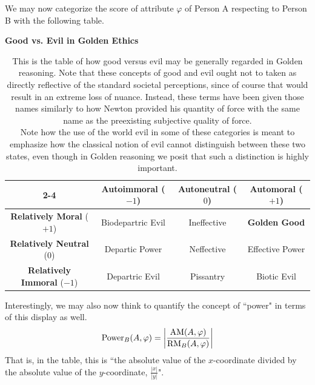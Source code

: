 We may now categorize the score of attribute $\varphi$ of Person A respecting to Person B with the following table. 

\begin{table}[htbp]
    \centering
    \textbf{\large {Good vs. Evil in Golden Ethics}} \\
    \vspace{0.5em}
    \begin{tabular}{|c|c|c|c|}
        \cline{2-4}
        \multicolumn{1}{c|}{} & \textbf{Autoimmoral} ($-1$) & \textbf{Autoneutral} ($0$) & \textbf{Automoral} ($+1$) \\
        \hline
        \textbf{Relatively Moral} ($+1$) & Biodepartric Evil & Ineffective & \textbf{Golden Good} \\
        \hline
        \textbf{Relatively Neutral} ($0$) & Departic Power & Neffective & Effective Power \\
        \hline
        \textbf{Relatively Immoral} ($-1$) & Departric Evil & Pissantry & Biotic Evil \\
        \hline
    \end{tabular}
    \caption{This is the table of how good versus evil may be generally regarded in Golden reasoning. Note that these concepts of good and evil ought not to taken as directly reflective of the standard societal perceptions, since of course that would result in an extreme loss of nuance. Instead, these terms have been given those names similarly to how Newton provided his quantity of force with the same name as the preexisting subjective quality of force.\\
    Note how the use of the world evil in some of these categories is meant to emphasize how the classical notion of evil cannot distinguish between these two states, even though in Golden reasoning we posit that such a distinction is highly important. }
    \label{tab:evil_types}
\end{table}

Interestingly, we may also now think to quantify the concept of ``power" in terms of this display as well.
\begin{equation}
    \textnormal{Power}_{B} \! \left( A, \varphi \right) = \left| {\dfrac{\textnormal{AM} \! \left( A, \varphi \right)}{\textnormal{RM}_{B} \! \left( A, \varphi \right)}} \right|
\end{equation}
That is, in the table, this is ``the absolute value of the $x$-coordinate divided by the absolute value of the $y$-coordinate, $\frac{\left| x \right|}{\left| y \right|}$". 

